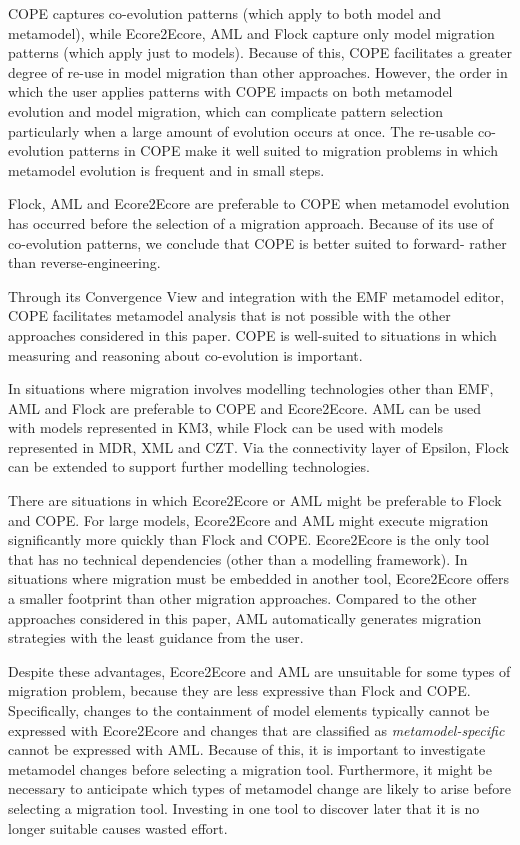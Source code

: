 COPE captures co-evolution patterns (which apply to both model and metamodel), while Ecore2Ecore, AML and Flock capture only model migration patterns (which apply just to models). Because of this, COPE facilitates a greater degree of re-use in model migration than other approaches. However, the order in which the user applies patterns with COPE impacts on both metamodel evolution and model migration, which can complicate pattern selection particularly when a large amount of evolution occurs at once. The re-usable co-evolution patterns in COPE make it well suited to migration problems in which metamodel evolution is frequent and in small steps.

Flock, AML and Ecore2Ecore are preferable to COPE when metamodel evolution has occurred before the selection of a migration approach. Because of its use of co-evolution patterns, we conclude that COPE is better suited to forward- rather than reverse-engineering.

Through its Convergence View and integration with the EMF metamodel editor, COPE facilitates metamodel analysis that is not possible with the other approaches considered in this paper. COPE is well-suited to situations in which measuring and reasoning about co-evolution is important.

In situations where migration involves modelling technologies other than EMF, AML and Flock are preferable to COPE and Ecore2Ecore. AML can be used with models represented in KM3, while Flock can be used with models represented in MDR, XML and CZT. Via the connectivity layer of Epsilon, Flock can be extended to support further modelling technologies.

There are situations in which Ecore2Ecore or AML might be preferable to Flock and COPE. For large models, Ecore2Ecore and AML might execute migration significantly more quickly than Flock and COPE. Ecore2Ecore is the only tool that has no technical dependencies (other than a modelling framework). In situations where migration must be embedded in another tool, Ecore2Ecore offers a smaller footprint than other migration approaches. Compared to the other approaches considered in this paper, AML automatically generates migration strategies with the least guidance from the user.

Despite these advantages, Ecore2Ecore and AML are unsuitable for some types of migration problem, because they are less expressive than Flock and COPE. Specifically, \cc changes to the containment of model elements typically cannot be expressed with Ecore2Ecore and changes that are classified as \emph{metamodel-specific} \cite{herrmannsdoerfer08automatability} cannot be expressed with AML. Because of this, it is important to investigate metamodel changes before selecting a migration tool. Furthermore, it might be necessary to anticipate which types of metamodel change are likely to arise before selecting a migration tool. Investing in one tool to discover later that it is no longer suitable causes wasted effort.

